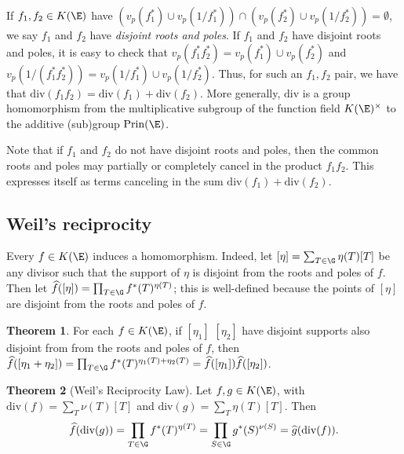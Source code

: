 \documentclass[11pt,letterpaper]{article}
\theoremstyle{definition}
\newtheorem{theorem}{Theorem}[subsection]
\newcommand{\ff}{K(\E)}
\newcommand{\6}{\mathbf}
\newcommand{\7}{\mathcal}
\begin{document}

If $f_1, f_2 \in \ff$ have $(v_p(f_1^*) \cup v_p(1/f_1^*)) \cap (v_p(f_2^*) \cup v_p(1/f_2^*)) = \emptyset$, we say $f_1$ and $f_2$ have \textit{disjoint roots and poles}. If $f_1$ and $f_2$ have disjoint roots and poles, it is easy to check that $v_p(f_1^*f_2^*) = v_p(f_1^*)\cup v_p(f_2^*)$ and $v_p(1/(f_1^* f_2^*)) = v_p(1/f_1^*)\cup v_p(1/f_2^*)$. Thus, for such an $f_1, f_2$ pair, we have that $\text{div}(f_1f_2) = \text{div}(f_1)+\text{div}(f_2)$. More generally, $\text{div}$ is a group homomorphism from the multiplicative subgroup of the function field $K(\E)^\times$ to the additive (sub)group $\text{Prin}(\E)$.

Note that if $f_1$ and $f_2$ do not have disjoint roots and poles, then the common roots and poles may partially or completely cancel in the product $f_1f_2$. This expresses itself as terms canceling in the sum $\text{div}(f_1) + \text{div}(f_2)$.



\subsection{Weil's reciprocity}

Every $f \in K(\E)$ induces a homomorphism. Indeed, let $[\eta] = \sum_{T \in \G} \eta(T)[T]$ be any divisor such that the support of $\eta$ is disjoint from the roots and poles of $f$. Then let $\widehat{f}([\eta]) = \prod_{T\in \G} f^*(T)^{\eta(T)}$; this is well-defined because the points of $[\eta]$ are disjoint from the roots and poles of $f$.

\begin{theorem}
For each $f \in K(\E)$, if $[\eta_1]$ $[\eta_2]$ have disjoint supports also disjoint from from the roots and poles of $f$, then $\widehat{f}([\eta_1+\eta_2]) = \prod_{T \in \G} f^*(T)^{\eta_1(T)+\eta_2(T)} = \widehat{f}([\eta_1])\widehat{f}([\eta_2])$.
\label{thm:inducedmaphom}
\end{theorem}


\begin{theorem}[Weil's Reciprocity Law]
Let $f, g \in K(\E)$, with $\text{div}(f) = \sum\limits_T \nu(T) [T]$ and $\text{div}(g) = \sum_T \eta(T) [T]$. Then \[\widehat{f}(\text{div}(g)) = \prod\limits_{T \in \G} f^*(T)^{\eta(T)} = \prod\limits_{S \in \G} g^*(S)^{\nu(S)} = \widehat{g}(\text{div}(f)).\] 
\end{theorem}
\end{document}
